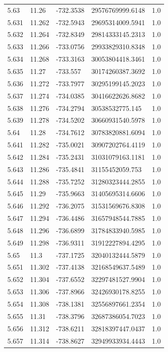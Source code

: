 \begin{tabular}{lllll}
5.63 & 11.26 & -732.3538 & 29576769999.6148 & 1.0 \\
5.631 & 11.262 & -732.5943 & 29695314009.5941 & 1.0 \\
5.632 & 11.264 & -732.8349 & 29814333145.2313 & 1.0 \\
5.633 & 11.266 & -733.0756 & 29933829310.8348 & 1.0 \\
5.634 & 11.268 & -733.3163 & 30053804418.3461 & 1.0 \\
5.635 & 11.27 & -733.557 & 30174260387.3692 & 1.0 \\
5.636 & 11.272 & -733.7977 & 30295199145.2023 & 1.0 \\
5.637 & 11.274 & -734.0385 & 30416622626.8682 & 1.0 \\
5.638 & 11.276 & -734.2794 & 30538532775.145 & 1.0 \\
5.639 & 11.278 & -734.5202 & 30660931540.5978 & 1.0 \\
5.64 & 11.28 & -734.7612 & 30783820881.6094 & 1.0 \\
5.641 & 11.282 & -735.0021 & 30907202764.4119 & 1.0 \\
5.642 & 11.284 & -735.2431 & 31031079163.1181 & 1.0 \\
5.643 & 11.286 & -735.4841 & 31155452059.753 & 1.0 \\
5.644 & 11.288 & -735.7252 & 31280323444.2855 & 1.0 \\
5.645 & 11.29 & -735.9663 & 31405695314.6606 & 1.0 \\
5.646 & 11.292 & -736.2075 & 31531569676.8308 & 1.0 \\
5.647 & 11.294 & -736.4486 & 31657948544.7885 & 1.0 \\
5.648 & 11.296 & -736.6899 & 31784833940.5985 & 1.0 \\
5.649 & 11.298 & -736.9311 & 31912227894.4295 & 1.0 \\
5.65 & 11.3 & -737.1725 & 32040132444.5879 & 1.0 \\
5.651 & 11.302 & -737.4138 & 32168549637.5489 & 1.0 \\
5.652 & 11.304 & -737.6552 & 32297481527.9904 & 1.0 \\
5.653 & 11.306 & -737.8966 & 32426930178.8255 & 1.0 \\
5.654 & 11.308 & -738.1381 & 32556897661.2354 & 1.0 \\
5.655 & 11.31 & -738.3796 & 32687386054.7023 & 1.0 \\
5.656 & 11.312 & -738.6211 & 32818397447.0437 & 1.0 \\
5.657 & 11.314 & -738.8627 & 32949933934.4443 & 1.0 \\

\end{tabular}
